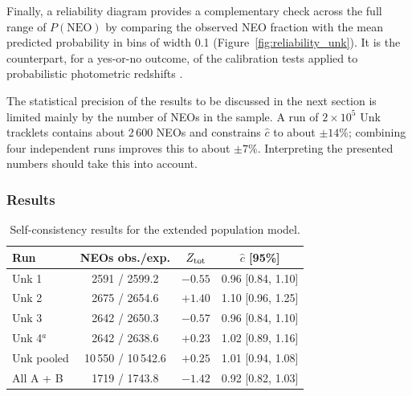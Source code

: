\documentclass[linenumbers,twocolumn]{aastex701}
\begin{document}
Finally, a reliability diagram provides a complementary check across the
full range of $P(\mathrm{NEO})$ by comparing the observed NEO fraction with
the mean predicted probability in bins of width 0.1
(Figure~\ref{fig:reliability_unk}). It is the counterpart, for a yes-or-no
outcome, of the calibration tests applied to probabilistic photometric
redshifts \citep[e.g.,][]{wittman2016,disanto2018}.


The statistical precision of the results to be discussed in the next section
is limited mainly by the number of NEOs in the sample.
A run of $2\times10^5$ Unk tracklets contains about 2\,600 NEOs and
constrains $\hat c$ to about $\pm14\%$; combining four independent runs
improves this to about $\pm7\%$. Interpreting the presented numbers
should take this into account.


\subsubsection{Results}
\label{sec:gateresults}

\begin{table}
\centering
\caption{Self-consistency results for the extended population model.}
\label{tab:gate}
\setlength{\tabcolsep}{4pt}
\begin{tabular}{lccc}
\hline
Run & NEOs obs./exp. & $Z_{\rm tot}$ & $\hat c$ [95\%] \\
\hline
Unk 1       & 2591 / 2599.2 & $-0.55$ & 0.96 [0.84, 1.10] \\
Unk 2       & 2675 / 2654.6 & $+1.40$ & 1.10 [0.96, 1.25] \\
Unk 3       & 2642 / 2650.3 & $-0.57$ & 0.96 [0.84, 1.10] \\
Unk 4$^a$   & 2642 / 2638.6 & $+0.23$ & 1.02 [0.89, 1.16] \\
Unk pooled  & 10\,550 / 10\,542.6 & $+0.25$ & 1.01 [0.94, 1.08] \\
\hline
All A + B   & 1719 / 1743.8 & $-1.42$ & 0.92 [0.82, 1.03] \\
\hline
\end{tabular}
\end{table}
\end{document}
